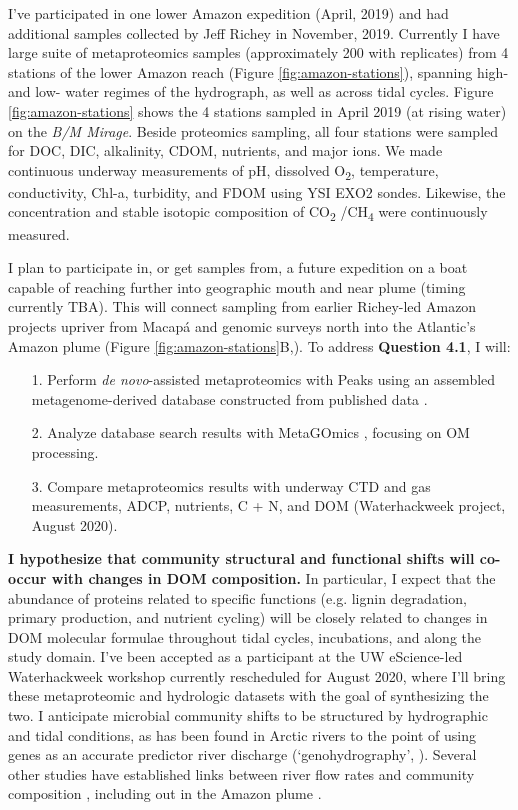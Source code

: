 \documentclass[12pt, letterpaper, twoside]{article}
\begin{document}
I've participated in one lower Amazon expedition (April, 2019) and had additional samples collected by Jeff Richey in November, 2019. Currently I have large suite of metaproteomics samples (approximately 200 with replicates) from 4 stations of the lower Amazon reach (Figure \ref{fig:amazon-stations}), spanning high- and low- water regimes of the hydrograph, as well as across tidal cycles. Figure \ref{fig:amazon-stations} shows the 4 stations sampled in April 2019 (at rising water) on the \textit{B/M Mirage}. Beside proteomics sampling, all four stations were sampled for DOC, DIC, alkalinity, CDOM, nutrients, and major ions. We made continuous underway measurements of pH, dissolved O\textsubscript{2}, temperature, conductivity, Chl-a, turbidity, and FDOM using YSI EXO2 sondes. Likewise, the concentration and stable isotopic composition of CO\textsubscript{2} /CH\textsubscript{4} were continuously measured. 


I plan to participate in, or get samples from, a future expedition on a boat capable of reaching further into geographic mouth and near plume (timing currently TBA). This will connect sampling from earlier Richey-led Amazon projects upriver from Macap\'{a} and genomic surveys north into the Atlantic's Amazon plume (Figure \ref{fig:amazon-stations}B,). To address \textbf{Question 4.1}, I will:

\begin{enumerate}
	\item[1.] Perform \textit{de novo}-assisted metaproteomics with Peaks using an assembled metagenome-derived database constructed from published data \cite{satinsky_amazon_2014, doherty_bacterial_2017, satinsky_metagenomic_2015, ghai_metagenomics_2011}.
	\item[2.] Analyze database search results with MetaGOmics \cite{riffle_metagomics_2017}, focusing on OM processing.
	\item[3.] Compare metaproteomics results with underway CTD and gas measurements, ADCP, nutrients, C + N, and DOM (Waterhackweek project, August 2020). 
\end{enumerate}  

\bigskip

\textbf{I hypothesize that community structural and functional shifts will co-occur with changes in DOM composition.} In particular, I expect that the abundance of proteins related to specific functions (e.g. lignin degradation, primary production, and nutrient cycling) will be closely related to changes in DOM molecular formulae throughout tidal cycles, incubations, and along the study domain. I've been accepted as a participant at the UW eScience-led Waterhackweek workshop currently rescheduled for August 2020, where I'll bring these metaproteomic and hydrologic datasets with the goal of synthesizing the two. I anticipate microbial community shifts to be structured by hydrographic and tidal conditions, as has been found in Arctic rivers to the point of using genes as an accurate predictor river discharge (‘genohydrography’, \cite{good_predicting_2018}). Several other studies have established links between river flow rates and community composition \cite{crump_synchrony_2005}, including out in the Amazon plume \cite{doherty_bacterial_2017}. 
 
\end{document}
